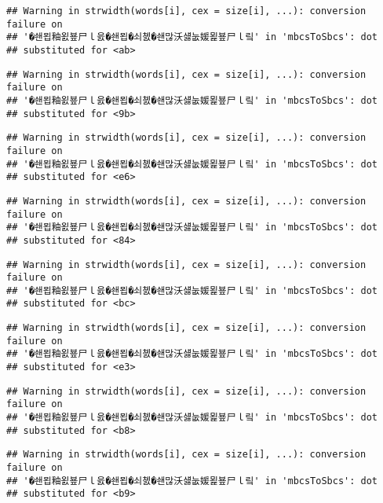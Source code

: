 \documentclass[]{article}
\begin{document}
\begin{verbatim}
## Warning in strwidth(words[i], cex = size[i], ...): conversion failure on
## '�쇈묍釉욄뵾尸ｌ읈�쇈묍�쇠쳸�쇈많沃섏눖媛묉뵾尸ｌ맄' in 'mbcsToSbcs': dot
## substituted for <ab>
\end{verbatim}

\begin{verbatim}
## Warning in strwidth(words[i], cex = size[i], ...): conversion failure on
## '�쇈묍釉욄뵾尸ｌ읈�쇈묍�쇠쳸�쇈많沃섏눖媛묉뵾尸ｌ맄' in 'mbcsToSbcs': dot
## substituted for <9b>
\end{verbatim}

\begin{verbatim}
## Warning in strwidth(words[i], cex = size[i], ...): conversion failure on
## '�쇈묍釉욄뵾尸ｌ읈�쇈묍�쇠쳸�쇈많沃섏눖媛묉뵾尸ｌ맄' in 'mbcsToSbcs': dot
## substituted for <e6>
\end{verbatim}

\begin{verbatim}
## Warning in strwidth(words[i], cex = size[i], ...): conversion failure on
## '�쇈묍釉욄뵾尸ｌ읈�쇈묍�쇠쳸�쇈많沃섏눖媛묉뵾尸ｌ맄' in 'mbcsToSbcs': dot
## substituted for <84>
\end{verbatim}

\begin{verbatim}
## Warning in strwidth(words[i], cex = size[i], ...): conversion failure on
## '�쇈묍釉욄뵾尸ｌ읈�쇈묍�쇠쳸�쇈많沃섏눖媛묉뵾尸ｌ맄' in 'mbcsToSbcs': dot
## substituted for <bc>
\end{verbatim}

\begin{verbatim}
## Warning in strwidth(words[i], cex = size[i], ...): conversion failure on
## '�쇈묍釉욄뵾尸ｌ읈�쇈묍�쇠쳸�쇈많沃섏눖媛묉뵾尸ｌ맄' in 'mbcsToSbcs': dot
## substituted for <e3>
\end{verbatim}

\begin{verbatim}
## Warning in strwidth(words[i], cex = size[i], ...): conversion failure on
## '�쇈묍釉욄뵾尸ｌ읈�쇈묍�쇠쳸�쇈많沃섏눖媛묉뵾尸ｌ맄' in 'mbcsToSbcs': dot
## substituted for <b8>
\end{verbatim}

\begin{verbatim}
## Warning in strwidth(words[i], cex = size[i], ...): conversion failure on
## '�쇈묍釉욄뵾尸ｌ읈�쇈묍�쇠쳸�쇈많沃섏눖媛묉뵾尸ｌ맄' in 'mbcsToSbcs': dot
## substituted for <b9>
\end{verbatim}
\end{document}
